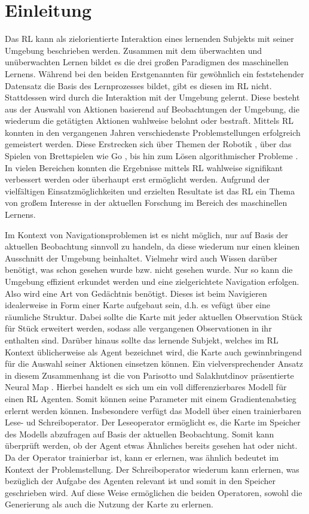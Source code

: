 \chapter{Einleitung}

Das \ac{RL} kann als zielorientierte Interaktion eines lernenden Subjekts mit seiner Umgebung beschrieben werden. Zusammen mit dem überwachten und unüberwachten Lernen bildet es die drei großen Paradigmen des maschinellen Lernens. Während bei den beiden Erstgenannten für gewöhnlich ein feststehender Datensatz die Basis des Lernprozesses bildet, gibt es diesen im \ac{RL} nicht. Stattdessen wird durch die Interaktion mit der Umgebung gelernt. Diese besteht aus der Auswahl von Aktionen basierend auf Beobachtungen der Umgebung, die wiederum die getätigten Aktionen wahlweise belohnt oder bestraft. Mittels \ac{RL} konnten in den vergangenen Jahren verschiedenste Problemstellungen erfolgreich gemeistert werden. Diese Erstrecken sich über Themen der Robotik \cite{MappingPlanning}, über das Spielen von Brettspielen wie Go \cite{Go}, bis hin zum Lösen algorithmischer Probleme \cite{DNC}. In vielen Bereichen konnten die Ergebnisse mittels \ac{RL} wahlweise signifikant verbessert werden oder überhaupt erst ermöglicht werden. Aufgrund der vielfältigen Einsatzmöglichkeiten und erzielten Resultate ist das \ac{RL} ein Thema von großem Interesse in der aktuellen Forschung im Bereich des maschinellen Lernens.

Im Kontext von Navigationsproblemen ist es nicht möglich, nur auf Basis der aktuellen Beobachtung sinnvoll zu handeln, da diese wiederum nur einen kleinen Ausschnitt der Umgebung beinhaltet. Vielmehr wird auch Wissen darüber benötigt, was schon gesehen wurde bzw. nicht gesehen wurde. Nur so kann die Umgebung effizient erkundet werden und eine zielgerichtete Navigation erfolgen. Also wird eine Art von Gedächtnis benötigt. Dieses ist beim Navigieren idealerweise in Form einer Karte aufgebaut sein, d.h. es vefügt über eine räumliche Struktur. Dabei sollte die Karte mit jeder aktuellen Observation Stück für Stück erweitert werden, sodass alle vergangenen Observationen in ihr enthalten sind. Darüber hinaus sollte das lernende Subjekt, welches im \ac{RL} Kontext üblicherweise als Agent bezeichnet wird, die Karte auch gewinnbringend für die Auswahl seiner Aktionen einsetzen können. Ein vielversprechender Ansatz in diesem Zusammenhang ist die von Parisotto und Salakhutdinov präsentierte Neural Map \cite{NeuralMap}. Hierbei handelt es sich um ein voll differenzierbares Modell für einen \ac{RL} Agenten. Somit können seine Parameter mit einem Gradientenabstieg erlernt werden können. Insbesondere verfügt das Modell über einen trainierbaren Lese- ud Schreiboperator. Der Leseoperator ermöglicht es, die Karte im Speicher des Modells abzufragen auf Basis der aktuellen Beobachtung. Somit kann überprüft werden, ob der Agent etwas Ähnliches bereits gesehen hat oder nicht. Da der Operator trainierbar ist, kann er erlernen, was ähnlich bedeutet im Kontext der Problemstellung. Der Schreiboperator wiederum kann erlernen, was bezüglich der Aufgabe des Agenten relevant ist und somit in den Speicher geschrieben wird. Auf diese Weise ermöglichen die beiden Operatoren, sowohl die Generierung als auch die Nutzung der Karte zu erlernen.

